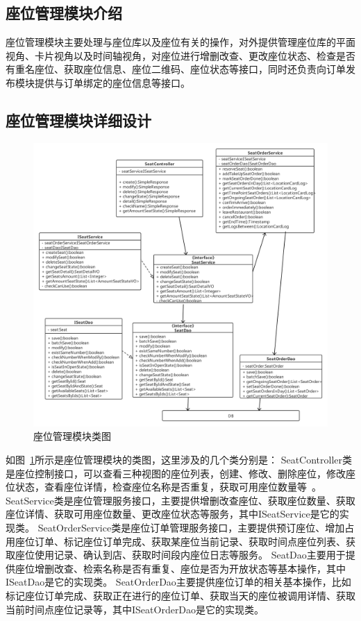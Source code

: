 \subsection{座位管理模块介绍}
座位管理模块主要处理与座位库以及座位有关的操作，对外提供管理座位库的平面视角、卡片视角以及时间轴视角，对座位进行增删改查、更改座位状态、检查是否有重名座位、获取座位信息、座位二维码、座位状态等接口，同时还负责向订单发布模块提供与订单绑定的座位信息等接口。\\

\subsection{座位管理模块详细设计}

\begin{figure}[htbp!]
    \centering
    \includegraphics[width=\linewidth]{FIGs/chapter4/seat.pdf}
    \caption{座位管理模块类图}\label{fig_seat}
\end{figure}

如图~\ref{fig_seat}所示是座位管理模块的类图，这里涉及的几个类分别是：
SeatController类是座位控制接口，可以查看三种视图的座位列表，创建、修改、删除座位，修改座位状态，查看座位详情，检查座位名称是否重复，获取可用座位数量等~\cite{qjh2019}。
SeatService类是座位管理服务接口，主要提供增删改查座位、获取座位数量、获取座位详情、获取可用座位数量、更改座位状态等服务，其中ISeatService是它的实现类。
SeatOrderService类是座位订单管理服务接口，主要提供预订座位、增加占用座位订单、标记座位订单完成、获取某座位当前记录、获取时间点座位列表、获取座位使用记录、确认到店、获取时间段内座位日志等服务。
SeatDao主要用于提供座位增删改查、检索名称是否有重复、座位是否为开放状态等基本操作，其中ISeatDao是它的实现类。
SeatOrderDao主要提供座位订单的相关基本操作，比如标记座位订单完成、获取正在进行的座位订单、获取当天的座位被调用详情、获取当前时间点座位记录等，其中ISeatOrderDao是它的实现类。\\

